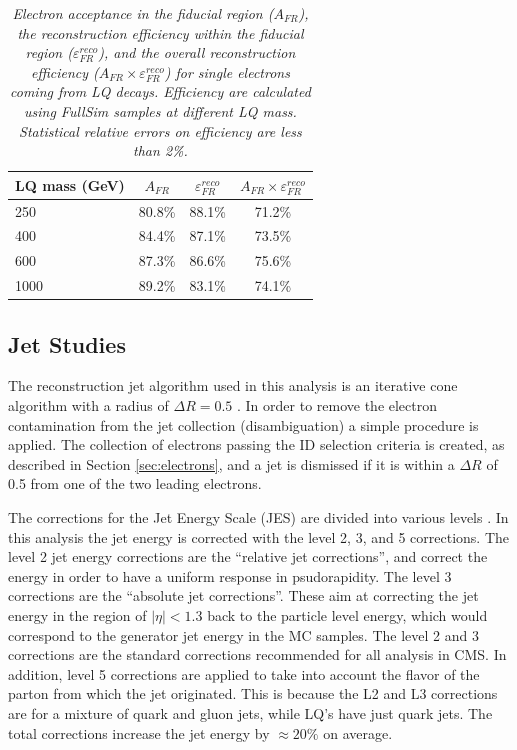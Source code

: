 \documentclass{cmspaper}
\begin{document}
\begin{linenumbers}
\begin{table}[htb]
  \label{tab:ElecEffAcc}
  \begin{center}
    \begin{tabular}{|l|c|c|c|} \hline
      LQ mass (GeV) & $A_{FR}$ & $\varepsilon_{FR}^{reco}$ & $A_{FR} \times \varepsilon_{FR}^{reco}$\\ \hline
      250 & 80.8\% & 88.1\% & 71.2\% \\ \hline
      400 & 84.4\% & 87.1\% & 73.5\% \\ \hline
      600 & 87.3\% & 86.6\% & 75.6\% \\ \hline
      1000 & 89.2\% & 83.1\% & 74.1\% \\ \hline
    \end{tabular}
    \caption{\small \sl Electron acceptance in the fiducial region ($A_{FR}$), the 
      reconstruction efficiency within the fiducial region ($\varepsilon_{FR}^{reco}$), and the overall reconstruction efficiency 
      ($A_{FR} \times \varepsilon_{FR}^{reco}$) for single electrons coming from LQ decays. Efficiency are 
      calculated using FullSim samples at different LQ mass. Statistical relative errors on efficiency are less than 2\%.}
  \end{center}
\end{table}

\subsection{Jet Studies} \label{sec:jet}

The reconstruction jet algorithm used in this analysis is an iterative cone algorithm with a radius of $\Delta R=0.5$ \cite{JetAlg}.  
In order to remove the electron contamination from the jet collection (disambiguation) a simple procedure is applied.  The collection 
of electrons passing the ID selection criteria is created, 
as described in Section \ref{sec:electrons}, and a jet is dismissed if it is within 
a $\Delta R$ of 0.5 from one of the two leading electrons. 

The corrections for the Jet Energy Scale (JES) are divided into various levels \cite{JES}.  
In this analysis the jet energy is corrected with the level 2, 3, and 5 corrections.  
The level 2 jet energy corrections are the 
``relative jet corrections'', and correct the energy in order to have a uniform response in psudorapidity.  
The level 3 corrections are the ``absolute jet corrections''.  These aim at correcting the jet energy in the 
region of $|\eta| < 1.3$ back to the particle level energy, which would correspond to the generator jet energy in the MC samples. 
The level 2 and 3 corrections are the standard corrections recommended for all analysis in CMS. 
In addition, level 5 corrections are applied to take into account the flavor of the parton from which the jet originated.
This is because the L2 and L3 corrections are for a mixture of quark and gluon jets, while LQ's 
have just quark jets. The total corrections increase the jet energy by $\approx 20\%$ on average.


\end{linenumbers}
\end{document}
